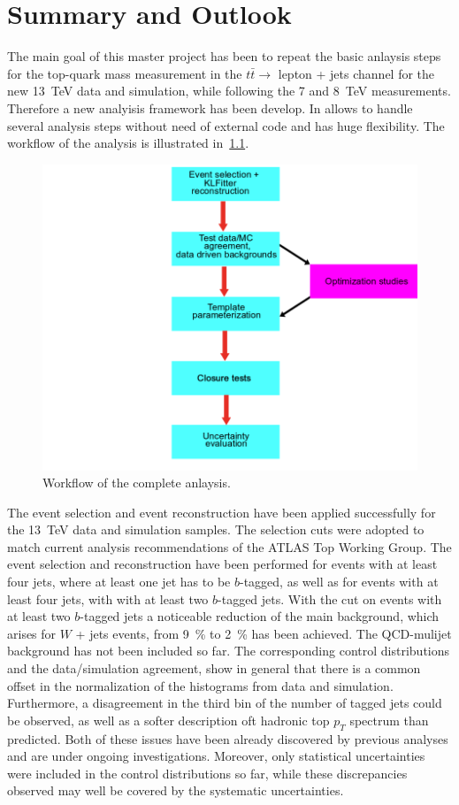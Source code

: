 \chapter{Summary and Outlook}
\label{sec:sum}

The main goal of this master project has been to repeat the basic anlaysis steps for the top-quark mass measurement in the $t\bar{t} \rightarrow $ lepton + jets channel for the new 13~TeV data and simulation, while following the  7 and 8~TeV measurements. Therefore a new analyisis framework has been develop. In allows to handle several analysis steps without need of external code and has huge flexibility. The workflow of the analysis is illustrated in~\cref{fig:Workflow}.

\begin{figure}
	\center
	\includegraphics[width=0.6\linewidth]{Pics/Workflow}
	\caption{Workflow of the complete anlaysis.} \label{fig:Workflow}
\end{figure}

 The event selection and event reconstruction have been applied successfully for the 13~TeV data and simulation samples. The selection cuts were adopted to match current analysis recommendations of the ATLAS Top Working Group. The event selection and reconstruction have been performed for events with at least four jets, where at least one jet has to be $b$-tagged, as well as for events with at least four jets, with with at least two $b$-tagged jets.  With the cut on events with at least two $b$-tagged jets a noticeable reduction of the main background, which arises for $W$  + jets events, from 9~\% to 2~\% has been  achieved. The QCD-mulijet background has not been included so far. The corresponding control distributions and  the data/simulation agreement, show in general that there is a common offset in the normalization of the histograms from data and simulation. Furthermore, a disagreement  in the third bin of the number of tagged jets could be observed, as well as a softer description oft hadronic top $p_T$ spectrum than predicted. Both of these issues have been already discovered by previous analyses and are under ongoing investigations. Moreover, only statistical uncertainties were included in the control distributions so far, while these discrepancies observed may well be covered by the systematic uncertainties.
 

